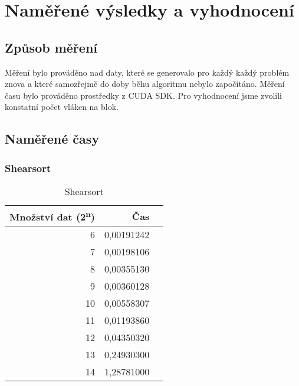 \documentclass[12pt]{article}
\begin{document}
\section{Naměřené výsledky a vyhodnocení}
\subsection{Způsob měření}
Měření bylo prováděno nad daty, které se generovalo pro každý každý problém znova a které samozřejmě do doby běhu algoritmu nebylo započítáno. Měření času bylo prováděno prostředky z CUDA SDK. Pro vyhodnocení jsme zvolili konstatní počet vláken na blok.

\subsection{Naměřené časy}
\subsubsection{Shearsort}
\begin{table}[H]
\begin{center}
\begin{tabular}{|r|r|r|}
\hline Množství dat (2\textsuperscript{n}) & Čas \\ \hline
6 &  0,00191242 \\ \hline
7 &  0,00198106 \\ \hline
8 &  0,00355130 \\ \hline
9 &  0,00360128 \\ \hline
10 & 0,00558307 \\ \hline
11 & 0,01193860 \\ \hline
12 & 0,04350320 \\ \hline
13 & 0,24930300 \\ \hline
14 & 1,28781000 \\ \hline
\end{tabular} 
\end{center}
\caption{Shearsort}
\end{table} 
\end{document}
